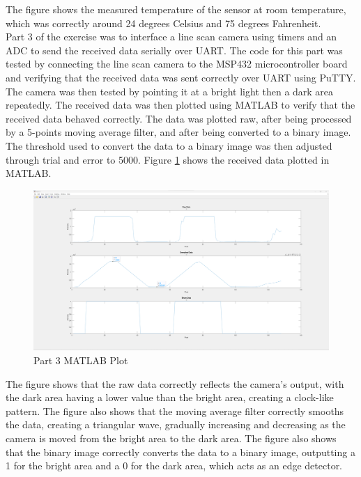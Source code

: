 \documentclass[CMPE]{KGCOEReport}
\begin{document}
The figure shows the measured temperature of the sensor at room temperature, which was correctly around 24 degrees Celsius and 75 degrees Fahrenheit.\\

Part 3 of the exercise was to interface a line scan camera using timers and an ADC to send the received data serially over UART. The code for this part was tested by connecting the line scan camera to the MSP432 microcontroller board and verifying that the received data was sent correctly over UART using PuTTY.\\

The camera was then tested by pointing it at a bright light then a dark area repeatedly. The received data was then plotted using MATLAB to verify that the received data behaved correctly. The data was plotted raw, after being processed by a 5-points moving average filter, and after being converted to a binary image. The threshold used to convert the data to a binary image was then adjusted through trial and error to 5000. Figure \ref{fig:part3} shows the received data plotted in MATLAB.

\begin{figure}[H]
    \centering
    \includegraphics[width=1.00\textwidth]{part3.png}
    \caption{Part 3 MATLAB Plot}
    \label{fig:part3}
\end{figure}

The figure shows that the raw data correctly reflects the camera's output, with the dark area having a lower value than the bright area, creating a clock-like pattern. The figure also shows that the moving average filter correctly smooths the data, creating a triangular wave, gradually increasing and decreasing as the camera is moved from the bright area to the dark area. The figure also shows that the binary image correctly converts the data to a binary image, outputting a 1 for the bright area and a 0 for the dark area, which acts as an edge detector.\\
\end{document}
